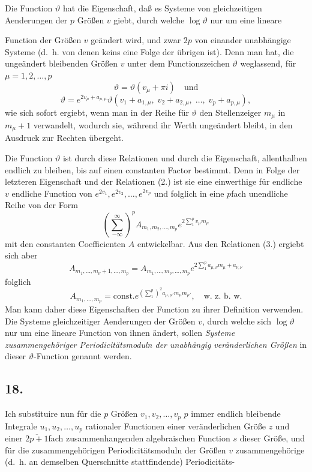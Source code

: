 \documentclass{article}
\begin{document}
Die Function $\vartheta$ hat die Eigenschaft, daß es Systeme von gleichzeitigen Aenderungen der $p$ Größen $v$ giebt, durch welche $\log\vartheta$ nur um eine lineare

Function der Größen $v$ geändert wird, und zwar $2p$ von einander unabhängige Systeme (d.~h. von denen keins eine Folge der übrigen ist). Denn man hat, die ungeändert bleibenden Größen $v$ unter dem Functionszeichen $\vartheta$ weglassend, für $\mu = 1, 2, \ldots, p$
\[ \vartheta = \vartheta(v_{\mu} + \pi i) \quad \text{und} \tag{2.} \]
\[ \vartheta = e^{2v_{\mu} + a_{\mu,\mu}} \vartheta(v_{1} + a_{1,\mu}, \; v_{2} + a_{2,\mu}, \; \ldots, \; v_{p} + a_{p,\mu}), \tag{3.} \]
wie sich sofort ergiebt, wenn man in der Reihe für $\vartheta$ den Stellenzeiger $m_{\mu}$ in $m_{\mu}+1$ verwandelt, wodurch sie, während ihr Werth ungeändert bleibt, in den Ausdruck zur Rechten übergeht.

Die Function $\vartheta$ ist durch diese Relationen und durch die Eigenschaft, allenthalben endlich zu bleiben, bis auf einen constanten Factor bestimmt. Denn in Folge der letzteren Eigenschaft und der Relationen (2.) ist sie eine einwerthige für endliche $v$ endliche Function von $e^{2v_{1}}, e^{2v_{2}}, \ldots, e^{2v_{p}}$ und folglich in eine $p$fach unendliche Reihe von der Form
\[ \left(\sum_{-\infty}^{\infty}\right)^{p} A_{m_{1}, m_{2}, \ldots, m_{p}} e^{2 \sum_{1}^{p} v_{\mu} m_{\mu}} \]
mit den constanten Coefficienten $A$ entwickelbar. Aus den Relationen (3.) ergiebt sich aber
\[ A_{m_{1}, \ldots, m_{\nu}+1, \ldots, m_{p}} = A_{m_{1}, \ldots, m_{\nu}, \ldots, m_{p}} e^{2 \sum_{1}^{p} a_{\mu,\nu} m_{\mu} + a_{\nu,\nu}} \]
folglich
\[ A_{m_{1}, \ldots, m_{p}} = \text{const.} e^{\left(\sum_{1}^{p}\right)^{2} a_{\mu,\mu'} m_{\mu} m_{\mu'}}, \quad \text{w.~z.~b.~w.} \]
Man kann daher diese Eigenschaften der Function zu ihrer Definition verwenden. Die Systeme gleichzeitiger Aenderungen der Größen $v$, durch welche sich $\log\vartheta$ nur um eine lineare Function von ihnen ändert, sollen \emph{Systeme zusammengehöriger Periodicitätsmoduln der unabhängig veränderlichen Größen} in dieser $\vartheta$-Function genannt werden.

\subsection*{18.}

Ich substituire nun für die $p$ Größen $v_{1}, v_{2}, \ldots, v_{p}$ $p$ immer endlich bleibende Integrale $u_{1}, u_{2}, \ldots, u_{p}$ rationaler Functionen einer veränderlichen Größe $z$ und einer $\overline{2p+1}$fach zusammenhangenden algebraischen Function $s$ dieser Größe, und für die zusammengehörigen Periodicitätsmoduln der Größen $v$ zusammengehörige (d.~h. an demselben Querschnitte stattfindende) Periodicitäts-
\end{document}
